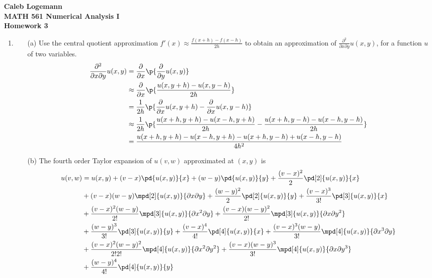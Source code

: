 \documentclass[11pt]{article}
\begin{document}
\noindent \textbf{\Large{Caleb Logemann \\
MATH 561 Numerical Analysis I \\
Homework 3
}}

\begin{enumerate}
    \item %
        \begin{enumerate}
            \item[(a)] Use the central quotient approximation $f'(x) \approx
                \frac{f(x + h) - f(x - h)}{2h}$ to obtain an approximation of
                $\frac{\partial^2}{\partial x \partial y} u(x,y)$, for a function
                $u$ of two variables.
                \begin{align*}
                    \frac{\partial^2}{\partial x \partial y} u(x,y) &=
                        \frac{\partial}{\partial x} \p{\frac{\partial}{\partial y} u(x,y)} \\
                    &\approx \frac{\partial}{\partial x} \p{\frac{u(x,y + h) - u(x,y - h)}{2h}} \\
                    &= \frac{1}{2h} \p{\frac{\partial}{\partial x} u(x,y+h) -
                        \frac{\partial}{\partial x} u(x,y-h)} \\
                    &\approx \frac{1}{2h} \p{\frac{u(x+h, y+h) - u(x-h, y+h)}{2h} -
                        \frac{u(x+h, y-h) - u(x-h, y-h)}{2h}} \\
                    &= \frac{u(x+h, y+h) - u(x-h, y+h) - u(x+h, y-h) + u(x-h, y-h)}{4h^2} \\
                \end{align*}

            \item[(b)]
                The fourth order Taylor expansion of $u(v,w)$ approximated at $(x,y)$ is
                \begin{align*}
                    u(v,w) &= u(x,y) + (v - x)\pd{u(x,y)}{x} + (w - y)\pd{u(x,y)}{y}
                    + \frac{(v-x)^2}{2} \pd[2]{u(x,y)}{x} \\
                    &+ (v-x)(w-y)\mpd[2]{u(x,y)}{\partial x \partial y}
                    + \frac{(w-y)^2}{2}\pd[2]{u(x,y)}{y}
                    + \frac{(v-x)^3}{3!}\pd[3]{u(x,y)}{x} \\
                    &+ \frac{(v-x)^2(w-y)}{2!} \mpd[3]{u(x,y)}{\partial x^2 \partial y}
                    + \frac{(v-x)(w-y)^2}{2!} \mpd[3]{u(x,y)}{\partial x \partial y^2} \\
                    &+ \frac{(w-y)^3}{3!} \pd[3]{u(x,y)}{y}
                    + \frac{(v-x)^4}{4!} \pd[4]{u(x,y)}{x}
                    + \frac{(v-x)^3(w-y)}{3!} \mpd[4]{u(x,y)}{\partial x^3 \partial y} \\
                    &+ \frac{(v-x)^2 (w-y)^2}{2! 2!} \mpd[4]{u(x,y)}{\partial x^2 \partial y^2}
                    + \frac{(v-x) (w-y)^3}{3!} \mpd[4]{u(x,y)}{\partial x \partial y^3} \\
                    &+ \frac{(w-y)^4}{4!} \pd[4]{u(x,y)}{y}
                \end{align*}


\end{enumerate}
\end{enumerate}
\end{document}
